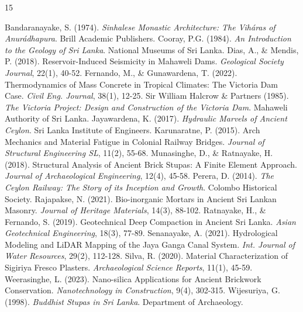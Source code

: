 \documentclass[12pt,a4paper]{report}
\begin{document}
	\renewcommand{\bibname}{References}
	\begin{thebibliography}{15}
		
		 Bandaranayake, S. (1974). \textit{Sinhalese Monastic Architecture: The Viháras of Anurádhapura}. Brill Academic Publishers.
		 Cooray, P.G. (1984). \textit{An Introduction to the Geology of Sri Lanka}. National Museums of Sri Lanka.
		 Dias, A., \& Mendis, P. (2018). Reservoir-Induced Seismicity in Mahaweli Dams. \textit{Geological Society Journal}, 22(1), 40-52.
		 Fernando, M., \& Gunawardena, T. (2022). Thermodynamics of Mass Concrete in Tropical Climates: The Victoria Dam Case. \textit{Civil Eng. Journal}, 38(1), 12-25.
		 Sir William Halcrow \& Partners (1985). \textit{The Victoria Project: Design and Construction of the Victoria Dam}. Mahaweli Authority of Sri Lanka.
		 Jayawardena, K. (2017). \textit{Hydraulic Marvels of Ancient Ceylon}. Sri Lanka Institute of Engineers.
		 Karunaratne, P. (2015). Arch Mechanics and Material Fatigue in Colonial Railway Bridges. \textit{Journal of Structural Engineering SL}, 11(2), 55-68.
		 Munasinghe, D., \& Ratnayake, H. (2018). Structural Analysis of Ancient Brick Stupas: A Finite Element Approach. \textit{Journal of Archaeological Engineering}, 12(4), 45-58.
		 Perera, D. (2014). \textit{The Ceylon Railway: The Story of its Inception and Growth}. Colombo Historical Society.
		 Rajapakse, N. (2021). Bio-inorganic Mortars in Ancient Sri Lankan Masonry. \textit{Journal of Heritage Materials}, 14(3), 88-102.
		 Ratnayake, H., \& Fernando, S. (2019). Geotechnical Deep Compaction in Ancient Sri Lanka. \textit{Asian Geotechnical Engineering}, 18(3), 77-89.
		 Senanayake, A. (2021). Hydrological Modeling and LiDAR Mapping of the Jaya Ganga Canal System. \textit{Int. Journal of Water Resources}, 29(2), 112-128.
		 Silva, R. (2020). Material Characterization of Sigiriya Fresco Plasters. \textit{Archaeological Science Reports}, 11(1), 45-59.
		 Weerasinghe, L. (2023). Nano-silica Applications for Ancient Brickwork Conservation. \textit{Nanotechnology in Construction}, 9(4), 302-315.
		 Wijesuriya, G. (1998). \textit{Buddhist Stupas in Sri Lanka}. Department of Archaeology.
		
	\end{thebibliography}
	
\end{document}
